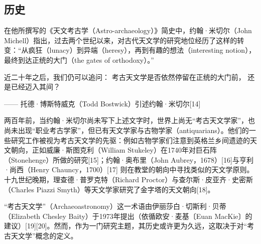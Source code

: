 \subsection{历史}
在他所撰写的《天文考古学（Astro-archaeology）》简史中，约翰·米切尔（John Michell）指出，过去两个世纪以来，对古代天文学的研究地位经历了这样的转变：“从疯狂（lunacy）到异端（heresy），再到有趣的想法（interesting notion），最终到达正统的大门（the gates of orthodoxy）。”  

近二十年之后，我们仍可以追问：  
考古天文学是否依然停留在正统的大门前，  
还是已经迈入其间？  

—— 托德·博斯特威克（Todd Bostwick）引述约翰·米切尔[14]

两百年前，当约翰·米切尔尚未写下上述文字时，世界上尚无“考古天文学家”，也尚未出现“职业考古学家”，但已有天文学家与古物学家（antiquarians）。他们的一些研究工作被视为考古天文学的先驱：例如古物学家们注意到英格兰乡间遗迹的天文朝向，正如威廉·斯图克利（William Stukeley）在1740年对巨石阵（Stonehenge）所做的研究[15]；约翰·奥布里（John Aubrey，1678）[16]与亨利·尚西（Henry Chauncy，1700）[17] 则在教堂的朝向中寻找类似的天文学原则。十九世纪晚期，理查德·普罗克特（Richard Proctor）与查尔斯·皮亚齐·史密斯（Charles Piazzi Smyth）等天文学家研究了金字塔的天文朝向[18]。

“考古天文学”（Archaeoastronomy）这一术语由伊丽莎白·切斯利·贝蒂（Elizabeth Chesley Baity）于1973年提出（依循欧安·麦基〔Euan MacKie〕的建议）[19][20]。然而，作为一门研究主题，其历史或许更为久远，这取决于对“考古天文学”概念的定义。  

